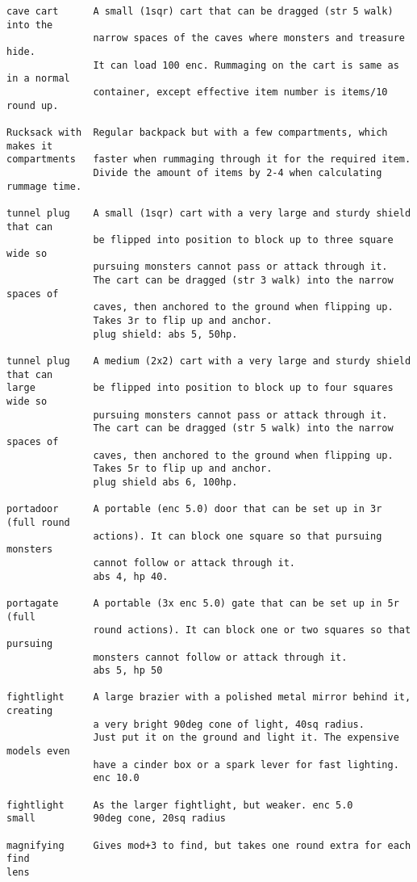 
\begin{verbatim}
cave cart      A small (1sqr) cart that can be dragged (str 5 walk) into the
               narrow spaces of the caves where monsters and treasure hide.
               It can load 100 enc. Rummaging on the cart is same as in a normal
               container, except effective item number is items/10 round up.

Rucksack with  Regular backpack but with a few compartments, which makes it
compartments   faster when rummaging through it for the required item.
               Divide the amount of items by 2-4 when calculating rummage time.

tunnel plug    A small (1sqr) cart with a very large and sturdy shield that can
               be flipped into position to block up to three square wide so
               pursuing monsters cannot pass or attack through it.
               The cart can be dragged (str 3 walk) into the narrow spaces of
               caves, then anchored to the ground when flipping up.
               Takes 3r to flip up and anchor.
               plug shield: abs 5, 50hp.

tunnel plug    A medium (2x2) cart with a very large and sturdy shield that can
large          be flipped into position to block up to four squares wide so
               pursuing monsters cannot pass or attack through it.
               The cart can be dragged (str 5 walk) into the narrow spaces of
               caves, then anchored to the ground when flipping up.
               Takes 5r to flip up and anchor.
               plug shield abs 6, 100hp.

portadoor      A portable (enc 5.0) door that can be set up in 3r (full round
               actions). It can block one square so that pursuing monsters
               cannot follow or attack through it.
               abs 4, hp 40.

portagate      A portable (3x enc 5.0) gate that can be set up in 5r (full
               round actions). It can block one or two squares so that pursuing
               monsters cannot follow or attack through it.
               abs 5, hp 50

fightlight     A large brazier with a polished metal mirror behind it, creating
               a very bright 90deg cone of light, 40sq radius.
               Just put it on the ground and light it. The expensive models even
               have a cinder box or a spark lever for fast lighting.
               enc 10.0

fightlight     As the larger fightlight, but weaker. enc 5.0
small          90deg cone, 20sq radius

magnifying     Gives mod+3 to find, but takes one round extra for each find
lens

\end{verbatim}
\normalsize





